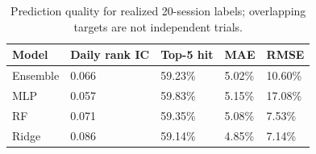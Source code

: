 \begin{table}[htbp]
\caption{Prediction quality for realized 20-session labels; overlapping targets are not independent trials.}
\label{tab:prediction}
\begin{tabular}{lllll}
\toprule
Model & Daily rank IC & Top-5 hit & MAE & RMSE \\
\midrule
Ensemble & 0.066 & 59.23\% & 5.02\% & 10.60\% \\
MLP & 0.057 & 59.83\% & 5.15\% & 17.08\% \\
RF & 0.071 & 59.35\% & 5.08\% & 7.53\% \\
Ridge & 0.086 & 59.14\% & 4.85\% & 7.14\% \\
\bottomrule
\end{tabular}
\end{table}
